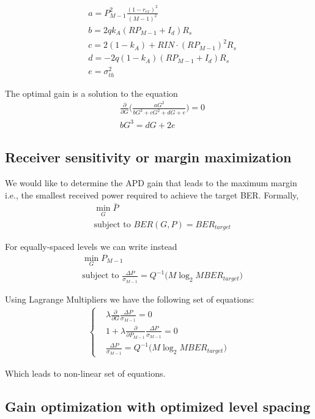 \documentclass[a4paper]{article}
\begin{document}
\begin{align}
& a = P^2_{M-1}\frac{(1-r_{ex})^2}{(M-1)^2} \\
& b = 2qk_A(RP_{M-1} + I_d)R_s \\
& c = 2(1-k_A) + RIN\cdot (RP_{M-1})^2R_s \\
& d = -2q(1-k_A)(RP_{M-1} + I_d)R_s \\
& e = \sigma_{th}^2 
\end{align}

The optimal gain is a solution to the equation
\begin{align}
& \frac{\partial}{\partial G}\bigg(\frac{aG^2}{bG^3 + cG^2 + dG + e}\bigg) = 0 \\
& bG^3 = dG + 2e 
\end{align}

\subsection{Receiver sensitivity or margin maximization}

We would like to determine the APD gain that leads to the maximum margin i.e., the smallest received power required to achieve the target BER. Formally,
\begin{align}
&\min_G \bar{P} \\
&\text{subject to } BER(G, P) = BER_{target}
\end{align}

For equally-spaced levels we can write instead
\begin{align}
&\min_G P_{M-1} \\
&\text{subject to } \frac{\Delta P}{\sigma_{M-1}} = Q^{-1}\Big(M\log_2 MBER_{target}\Big)
\end{align}

Using Lagrange Multipliers we have the following set of equations:
\begin{align}
\begin{cases}
& \lambda \frac{\partial}{\partial G} \frac{\Delta P}{\sigma_{M-1}} = 0 \\
& 1 + \lambda \frac{\partial}{\partial P_{M-1}} \frac{\Delta P}{\sigma_{M-1}} = 0 \\
& \frac{\Delta P}{\sigma_{M-1}} = Q^{-1}\Big(M\log_2 MBER_{target}\Big)
\end{cases}
\end{align}

Which leads to non-linear set of equations.

\subsection{Gain optimization with optimized level spacing}
\end{document}
